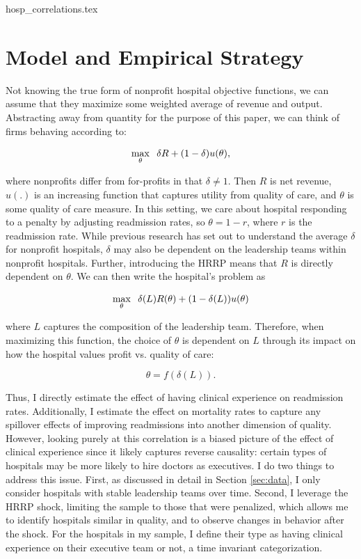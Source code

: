\documentclass[12pt]{article}
\begin{document}
    {hosp_correlations.tex}

    \section{Model and Empirical Strategy}

    Not knowing the true form of nonprofit hospital objective functions, we can assume that they maximize some weighted average of revenue and output. Abstracting away from quantity for the purpose of this paper, we can think of firms behaving according to:     
    
    $$\max_{\theta}\hspace{2mm} \delta R + (1-\delta) u(\theta),$$

    \noindent where nonprofits differ from for-profits in that $\delta\neq 1$. Then $R$ is net revenue, $u(.)$ is an increasing function that captures utility from quality of care, and $\theta$ is some quality of care measure. In this setting, we care about hospital responding to a penalty by adjusting readmission rates, so $\theta = 1-r$, where $r$ is the readmission rate. While previous research has set out to understand the average $\delta$ for nonprofit hospitals, $\delta$ may also be dependent on the leadership teams within nonprofit hospitals. Further, introducing the HRRP means that $R$ is directly dependent on $\theta$. We can then write the hospital's problem as 

    $$\max_{\theta}\hspace{2mm} \delta(L) R(\theta) + (1-\delta(L)) u(\theta)$$

    \noindent where $L$ captures the composition of the leadership team. Therefore, when maximizing this function, the choice of $\theta$ is dependent on $L$ through its impact on how the hospital values profit vs. quality of care:

    $$\theta = f(\delta(L)).$$

    Thus, I directly estimate the effect of having clinical experience on readmission rates. Additionally, I estimate the effect on mortality rates to capture any spillover effects of improving readmissions into another dimension of quality. However, looking purely at this correlation is a biased picture of the effect of clinical experience since it likely captures reverse causality: certain types of hospitals may be more likely to hire doctors as executives. I do two things to address this issue. First, as discussed in detail in Section \ref{sec:data}, I only consider hospitals with stable leadership teams over time. Second, I leverage the HRRP shock, limiting the sample to those that were penalized, which allows me to identify hospitals similar in quality, and to observe changes in behavior after the shock. For the hospitals in my sample, I define their type as having clinical experience on their executive team or not, a time invariant categorization. 
\end{document}

